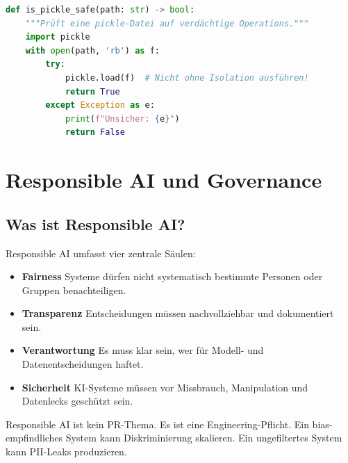 \begin{lstlisting}[language=Python, caption={Sicherheitsbasis: Pickle-Pre-Check}]
def is_pickle_safe(path: str) -> bool:
    """Prüft eine pickle-Datei auf verdächtige Operations."""
    import pickle
    with open(path, 'rb') as f:
        try:
            pickle.load(f)  # Nicht ohne Isolation ausführen!
            return True
        except Exception as e:
            print(f"Unsicher: {e}")
            return False
\end{lstlisting}


\section{Responsible AI und Governance}

\subsection{Was ist Responsible AI?}

Responsible AI umfasst vier zentrale Säulen:

\begin{itemize}

     \item \textbf{Fairness} Systeme dürfen nicht systematisch bestimmte Personen oder Gruppen benachteiligen.
     \item \textbf{Transparenz} Entscheidungen müssen nachvollziehbar und dokumentiert sein.
     \item \textbf{Verantwortung} Es muss klar sein, wer für Modell- und Datenentscheidungen haftet.
     \item \textbf{Sicherheit} KI-Systeme müssen vor Missbrauch, Manipulation und Datenlecks geschützt sein.
\end{itemize}

\par



\par\mbox{}\par
\begin{realitycheckEnv}
Responsible AI ist kein PR-Thema. Es ist eine Engineering-Pflicht. Ein bias-empfindliches System kann Diskriminierung skalieren. Ein ungefiltertes System kann PII-Leaks produzieren.
\end{realitycheckEnv}

